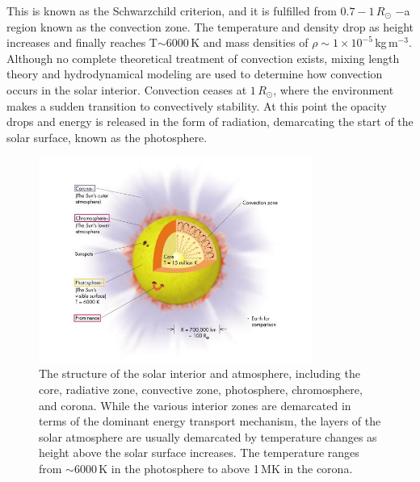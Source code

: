 This is known as the Schwarzchild criterion, and it is fulfilled from $0.7-1\,R_{\odot}$ $-$a region known as the convection zone. The temperature and density drop as height increases and finally reaches T$\sim$$6000$\,K and mass densities of $\rho\sim1\times10^{-5}$\,kg\,m$^{-3}$. Although no complete theoretical treatment of convection exists, mixing length theory and hydrodynamical modeling are used to determine how convection occurs in the solar interior. Convection ceases at $1\,R_{\odot}$, where the environment makes a sudden transition to convectively stability. At this point the opacity drops and energy is released in the form of radiation, demarcating the start of the solar surface, known as the photosphere. 
\begin{figure}[!t]
\begin{center}
\includegraphics[trim = 0cm 0.5cm 0cm 0cm, width=0.8\textwidth]{images/solar_atmosphere}
\caption[The solar interior and atmosphere]{The structure of the solar interior and atmosphere, including the core, radiative zone, convective zone, photosphere, chromosphere, and corona.  While the various interior zones are demarcated in terms of the dominant energy transport mechanism, the layers of the solar atmosphere are usually demarcated by temperature changes as height above the solar surface increases. The temperature ranges from $\sim$6000\,K in the photosphere to above 1\,MK in the corona.}
\label{fig:solar_atmosphere} 
\end{center}
\end{figure}


